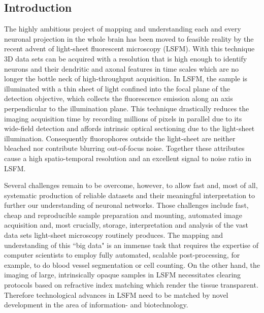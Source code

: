 \documentclass[12pt]{spieman}  %
\begin{document}
\begin{spacing}{2}   %

\section{Introduction}
\label{sect:intro}  

The highly ambitious project of mapping and understanding each and every neuronal projection in the whole brain has been moved to feasible reality by the recent advent of light-sheet fluorescent microscopy (LSFM)\cite{Huisken2004,Dodt2007,Keller2012}. With this technique 3D data sets can be acquired with a resolution that is high enough to identify neurons and their dendritic and axonal features in time scales which are no longer the bottle neck of high-throughput acquisition. In LSFM, the sample is illuminated with a thin sheet of light confined into the focal plane of the detection objective, which collects the fluorescence emission along an axis perpendicular to the illumination plane\cite{Huisken2009}. This technique drastically reduces the imaging acquisition time by recording millions of pixels in parallel due to its wide-field detection and affords intrinsic optical sectioning due to the light-sheet illumination. Consequently fluorophores outside the light-sheet are neither bleached nor contribute blurring out-of-focus noise. Together these attributes cause a high spatio-temporal resolution and an excellent signal to noise ratio in LSFM. 

Several challenges remain to be overcome, however, to allow fast and, most of all, systematic production of reliable datasets and their meaningful interpretation to further our understanding of neuronal networks. Those challenges include fast, cheap and reproducible sample preparation and mounting, automated image acquisition and, most crucially, storage, interpretation and analysis of the vast data sets light-sheet microscopy routinely produces\cite{Freeman2014,Burns2014}. The mapping and understanding of this ``big data" is an immense task that requires the expertise of computer scientists to employ fully automated, scalable post-processing, for example, to do blood vessel segmentation or cell counting\cite{Frasconi2014}. On the other hand, the imaging of large, intrinsically opaque samples in LSFM necessitates clearing protocols based on refractive index matching which render the tissue transparent\cite{Chung2013,Tomer2014}. Therefore technological advances in LSFM need to be matched by novel development in the area of information- and biotechnology.


\end{spacing}
\end{document}

